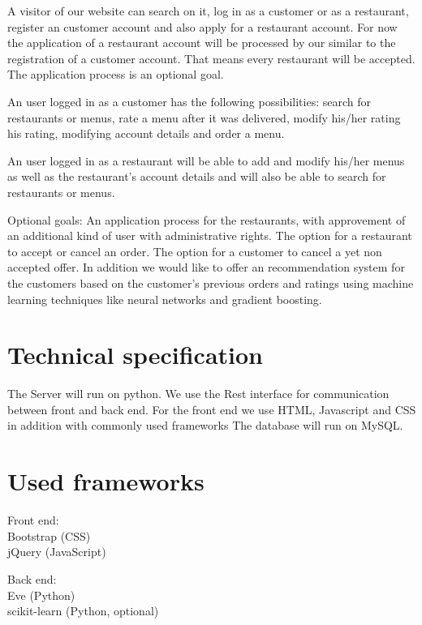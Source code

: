 \documentclass[parskip=half, a4paper, DIV=14]{scrartcl}
\begin{document}
A visitor of our website can search on it, log in as a customer or
as a restaurant, register an customer account and also apply for a restaurant account.
For now the application of a restaurant account will be processed by our similar to the
registration of a customer account. That means every restaurant will be accepted.
The application process is an optional goal.

An user logged in as a customer has the following possibilities: search
for restaurants or menus, rate a menu after it was
delivered, modify his/her rating his rating, modifying account details and
order a menu.

An user logged in as a restaurant will be able to add and modify 
his/her menus as well as the restaurant's account details 
and will also be able to search for restaurants or menus.

Optional goals: An application process for the restaurants, with 
approvement of an additional kind of user with administrative rights.
The option for a restaurant to accept or cancel an order.
The option for a customer to cancel a yet non accepted offer.
In addition we would like to offer an recommendation system for the customers based on the customer's
previous orders and ratings using machine learning techniques like neural networks
and gradient boosting.

\section{Technical specification}
The Server will run on python. We use the Rest interface for communication
between front and back end. For the front end we use HTML, Javascript and CSS in addition with commonly used frameworks
The database will run on MySQL.

\section{Used frameworks}
Front end:\\
Bootstrap (CSS)\\
jQuery (JavaScript)

Back end:\\
Eve (Python)\\
scikit-learn (Python, optional)
\end{document}
